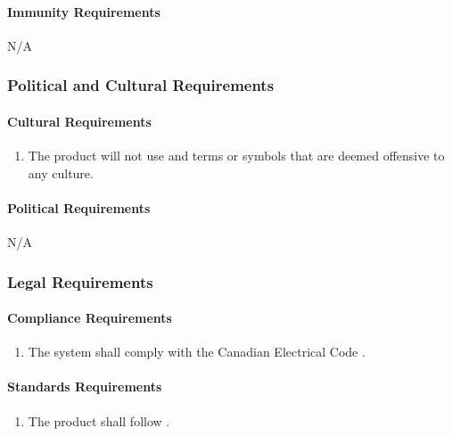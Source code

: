 \documentclass[12pt]{article}
\begin{document}
{\paragraph{Immunity Requirements}
N/A



\subsubsection{Political and Cultural Requirements}
\label{NFR_PC}
\paragraph{Cultural Requirements}
\begin{enumerate}[{PC}1., leftmargin=2\parindent]
    \item The product will not use and terms or symbols that are deemed offensive to any culture.
\end{enumerate}

\paragraph{Political Requirements}
N/A



\subsubsection{Legal Requirements}
\label{NFR_Legal}
\paragraph{Compliance Requirements}
\begin{enumerate}[{LR}1., leftmargin=2\parindent]
    \item The system shall comply with the Canadian Electrical Code \cite{CanadianElectricalCode2021}.
\end{enumerate}

\paragraph{Standards Requirements}
\begin{enumerate}[{LR}1., leftmargin=2\parindent, resume]
    \item The product shall follow \cite{WCAG2018}.
\end{enumerate}


}
\end{document}
